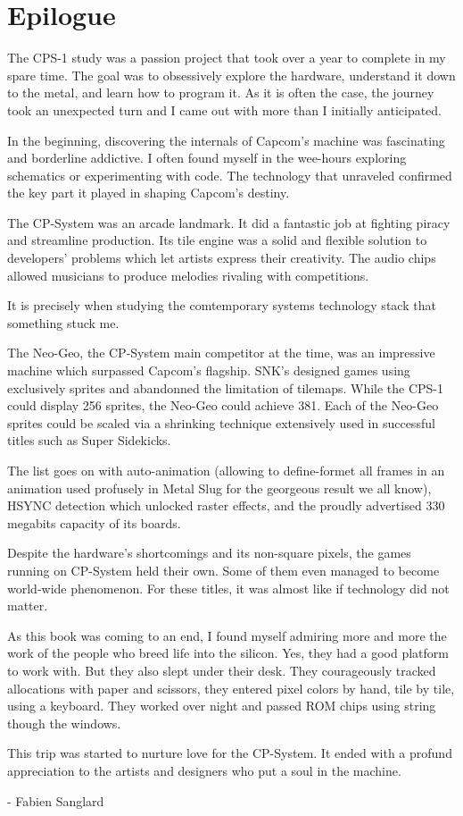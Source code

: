 \chapter{Epilogue} 

The CPS-1 study was a passion project that took over a year to complete in my spare time. The goal was to obsessively explore the hardware, understand it down to the metal, and learn how to program it. As it is often the case, the journey took an unexpected turn and I came out with  more than I initially anticipated.

In the beginning, discovering the internals of Capcom's machine was fascinating and borderline addictive. I often found myself in the wee-hours exploring schematics or experimenting with code. The technology that unraveled confirmed the key part it played in shaping Capcom's destiny. 

The CP-System was an arcade landmark. It did a fantastic job at fighting piracy and streamline production. Its tile engine was a solid and flexible solution to developers' problems which let artists express their creativity. The audio chips allowed musicians to produce melodies rivaling with competitions.

It is precisely when studying the comtemporary systems technology stack that something stuck me. 

The Neo-Geo, the CP-System main competitor at the time, was an impressive machine which surpassed Capcom's flagship. SNK's designed games using exclusively sprites and abandonned the limitation of tilemaps. While the CPS-1 could display 256 sprites, the Neo-Geo could achieve 381. Each of the Neo-Geo sprites could be scaled via a shrinking technique extensively used in successful titles such as Super Sidekicks. 

The list goes on with auto-animation (allowing to define-formet all frames in an animation used profusely in Metal Slug for the georgeous result we all know), HSYNC detection which unlocked raster effects, and the proudly advertised 330 megabits capacity of its boards.

Despite the hardware's shortcomings and its non-square pixels, the games running on CP-System held their own. Some of them even managed to become world-wide phenomenon. For these titles, it was almost like if technology did not matter.

As this book was coming to an end, I found myself admiring more and more the work of the people who breed life into the silicon. Yes, they had a good platform to work with. But they also slept under their desk. They courageously tracked allocations with paper and scissors, they entered pixel colors by hand, tile by tile, using a keyboard. They worked over night and passed ROM chips using string though the windows. 

This trip was started to nurture love for the CP-System. It ended with a profund appreciation to the artists and designers who put a soul in the machine.

- Fabien Sanglard
